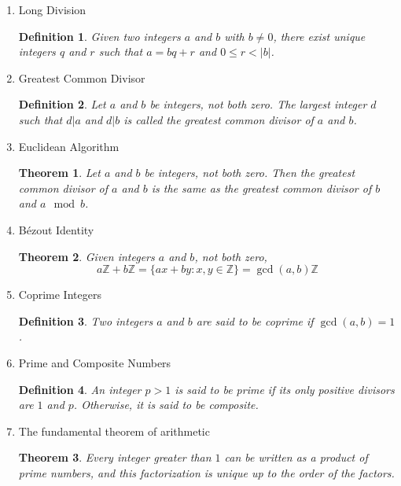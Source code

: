 \documentclass{article}
\newtheorem{definition}{Definition}[section]
\newtheorem{theorem}{Theorem}[section]
\begin{document}
    \begin{enumerate}
        \item Long Division
        \begin{definition}
            Given two integers $a$ and $b$ with $b \neq 0$, 
            there exist unique integers $q$ and $r$ such that $a = bq + r$ and $0 \leq r < |b|$.
        \end{definition}
        \item Greatest Common Divisor
        \begin{definition}
            Let $a$ and $b$ be integers, not both zero. The largest integer $d$ such that $d|a$ and $d|b$ is called the greatest common divisor of $a$ and $b$.
        \end{definition}
        \item Euclidean Algorithm
        \begin{theorem}
            Let $a$ and $b$ be integers, not both zero. Then the greatest common divisor of $a$ and $b$ is the same as the greatest common divisor of $b$ and $a \mod b$.
        \end{theorem}
        \item Bézout Identity
        \begin{theorem}
            Given integers $a$ and $b$, not both zero,
            \begin{equation}
                a \mathbb{Z} + b \mathbb{Z} = \{ax + by : x, y \in \mathbb{Z}\} = \gcd(a,b) \mathbb{Z}
            \end{equation}
        \end{theorem}
        \item Coprime Integers
        \begin{definition}
            Two integers $a$ and $b$ are said to be coprime if $\gcd(a,b) = 1$.
        \end{definition}
        \item Prime and Composite Numbers
        \begin{definition}
            An integer $p > 1$ is said to be prime if its only positive divisors are $1$ and $p$. Otherwise, it is said to be composite.
        \end{definition}
        \item The fundamental theorem of arithmetic
        \begin{theorem}
            Every integer greater than $1$ can be written as a product of prime numbers, and this factorization is unique up to the order of the factors.
        \end{theorem}

\end{enumerate}
\end{document}
